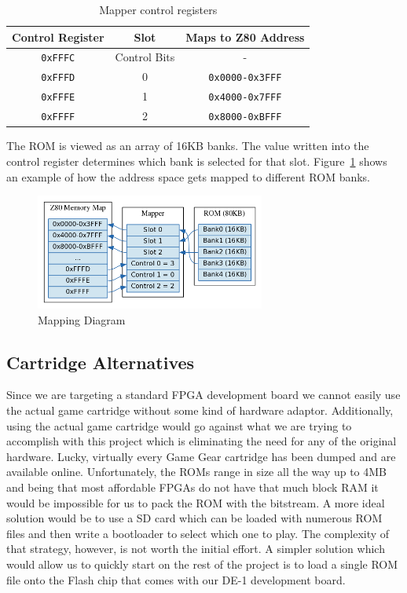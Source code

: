 \documentclass{article}
\begin{document}
\begin{table}[H]
    \centering
    \begin{tabular}{ccc}
        \toprule
        \textbf{Control Register} & \textbf{Slot} & \textbf{Maps to Z80 Address} \\
        \midrule
        \texttt{0xFFFC} & Control Bits & - \\
        \texttt{0xFFFD} & 0            & \texttt{0x0000-0x3FFF} \\
        \texttt{0xFFFE} & 1            & \texttt{0x4000-0x7FFF} \\
        \texttt{0xFFFF} & 2            & \texttt{0x8000-0xBFFF} \\
        \bottomrule
    \end{tabular}
    \caption{Mapper control registers \protect\cite{mapper}}
\end{table}

The ROM is viewed as an array of 16KB banks. The value written into the control
register determines which bank is selected for that slot.
Figure~\ref{fig:mapping_diagram} shows an example of how the address space gets
mapped to different ROM banks.

\begin{figure}[H]
\centering
\includegraphics[height=1.5in]{../images/mapper.png}
\caption{Mapping Diagram}
\label{fig:mapping_diagram}
\end{figure}

\subsection{Cartridge Alternatives}
Since we are targeting a standard FPGA development board we cannot easily use
the actual game cartridge without some kind of hardware adaptor.  Additionally,
using the actual game cartridge would go against what we are trying to
accomplish with this project which is eliminating the need for any of the
original hardware. Lucky, virtually every Game Gear cartridge has been dumped
and are available online.  Unfortunately, the ROMs range in size all the way up
to 4MB and being that most affordable FPGAs do not have that much block RAM it
would be impossible for us to pack the ROM with the bitstream. A more ideal
solution would be to use a SD card which can be loaded with numerous ROM files
and then write a bootloader to select which one to play.  The complexity of
that strategy, however, is not worth the initial effort. A simpler solution
which would allow us to quickly start on the rest of the project is to load a
single ROM file onto the Flash chip that comes with our DE-1 development board.
\end{document}
